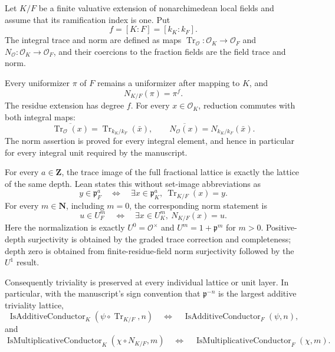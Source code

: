 \begin{theorem}\label{mod:ramification-unramifiedcompatibility}
Let $K/F$ be a finite valuative extension of nonarchimedean local fields and
assume that its ramification index is one.  Put
\[
 f=[K:F]=[k_K:k_F].
\]
The integral trace and norm are defined as maps
\(
 \operatorname{Tr}_{\mathcal O}\colon\mathcal O_K\to\mathcal O_F
\)
and
\(
 N_{\mathcal O}\colon\mathcal O_K\to\mathcal O_F
\), and their coercions to the fraction fields are the field trace and norm.

Every uniformizer $\pi$ of $F$ remains a uniformizer after mapping to $K$, and
\[
 N_{K/F}(\pi)=\pi^f.
\]
The residue extension has degree $f$.  For every $x\in\mathcal O_K$, reduction
commutes with both integral maps:
\[
 \overline{\operatorname{Tr}_{\mathcal O}(x)}
   =\operatorname{Tr}_{k_K/k_F}(\bar x),
 \qquad
 \overline{N_{\mathcal O}(x)}=N_{k_K/k_F}(\bar x).
\]
The norm assertion is proved for every integral element, and hence in
particular for every integral unit required by the manuscript.

For every $a\in\mathbf Z$, the trace image of the full fractional lattice is
exactly the lattice of the same depth.  Lean states this without set-image
abbreviations as
\[
 y\in\mathfrak p_F^a
 \quad\Longleftrightarrow\quad
 \exists x\in\mathfrak p_K^a,\ \operatorname{Tr}_{K/F}(x)=y.
\]
For every $m\in\mathbf N$, including $m=0$, the corresponding norm statement is
\[
 u\in U_F^m
 \quad\Longleftrightarrow\quad
 \exists x\in U_K^m,\ N_{K/F}(x)=u.
\]
Here the normalization is exactly $U^0=\mathcal O^\times$ and
$U^m=1+\mathfrak p^m$ for $m>0$.  Positive-depth surjectivity is obtained by
the graded trace correction and completeness; depth zero is obtained from
finite-residue-field norm surjectivity followed by the $U^1$ result.

Consequently triviality is preserved at every individual lattice or unit
layer.  In particular, with the manuscript's sign convention that
$\mathfrak p^{-n}$ is the largest additive triviality lattice,
\[
 \operatorname{IsAdditiveConductor}_K
   (\psi\circ\operatorname{Tr}_{K/F},n)
 \quad\Longleftrightarrow\quad
 \operatorname{IsAdditiveConductor}_F(\psi,n),
\]
and
\[
 \operatorname{IsMultiplicativeConductor}_K
   (\chi\circ N_{K/F},m)
 \quad\Longleftrightarrow\quad
 \operatorname{IsMultiplicativeConductor}_F(\chi,m).
\]


\end{theorem}
